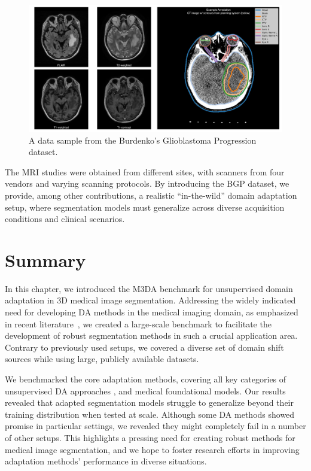 \begin{landscape}
\begin{figure}[p]
	\includegraphics[width=\linewidth]{Dissertation/Figures/4_da_bench/Burdenko-GBM-Progression-scaled.jpg}
	\caption{A data sample from the Burdenko's Glioblastoma Progression dataset.}
	\label{fig:gbpd}
\end{figure}
\end{landscape}



The MRI studies were obtained from different sites, with scanners from four vendors and varying scanning protocols. %
By introducing the BGP dataset, we provide, among other contributions, a realistic ``in-the-wild'' domain adaptation setup, where segmentation models must generalize across diverse acquisition conditions and clinical scenarios.


\section{Summary}

In this chapter, we introduced the M3DA benchmark for unsupervised domain adaptation in 3D medical image segmentation. Addressing the widely indicated need for developing DA methods in the medical imaging domain, as emphasized in recent literature~\cite{gulrajani2020search,uda_survey_2020,zhuang2020comprehensive,peng2018visda,zhang2021empirical}, we created a large-scale benchmark to facilitate the development of robust segmentation methods in such a crucial application area. Contrary to previously used setups, we covered a diverse set of domain shift sources while using large, publicly available datasets.

We benchmarked the core adaptation methods, covering all key categories of unsupervised DA approaches \cite{medim_da_survey_2021,medim_da_survey_2023}, and medical foundational models. Our results revealed that adapted segmentation models struggle to generalize beyond their training distribution when tested at scale. Although some DA methods showed promise in particular settings, we revealed they might completely fail in a number of other setups. This highlights a pressing need for creating robust methods for medical image segmentation, and we hope to foster research efforts in improving adaptation methods’ performance in diverse situations.

